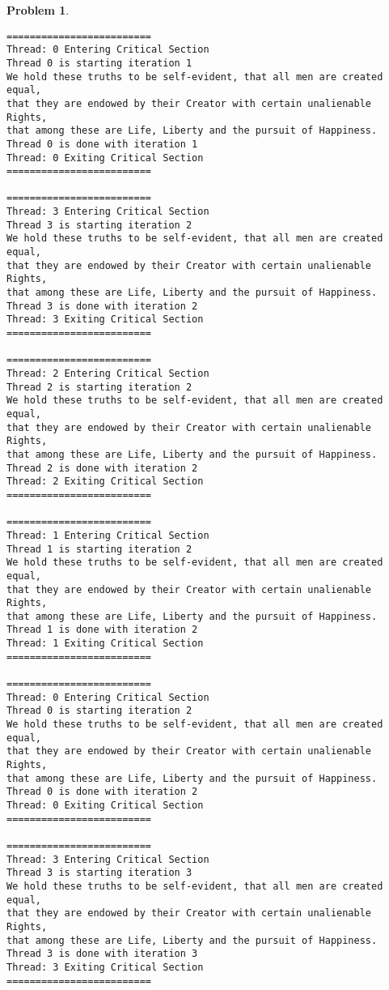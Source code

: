\documentclass{article}
\theoremstyle{problemstyle}
\newtheorem{problem}{Problem}
\begin{document}
\begin{problem}
\begin{enumerate}[label=(\alph*)]
\begin{lstlisting}
=========================
Thread: 0 Entering Critical Section
Thread 0 is starting iteration 1
We hold these truths to be self-evident, that all men are created equal,
that they are endowed by their Creator with certain unalienable Rights,
that among these are Life, Liberty and the pursuit of Happiness.
Thread 0 is done with iteration 1
Thread: 0 Exiting Critical Section
=========================

=========================
Thread: 3 Entering Critical Section
Thread 3 is starting iteration 2
We hold these truths to be self-evident, that all men are created equal,
that they are endowed by their Creator with certain unalienable Rights,
that among these are Life, Liberty and the pursuit of Happiness.
Thread 3 is done with iteration 2
Thread: 3 Exiting Critical Section
=========================

=========================
Thread: 2 Entering Critical Section
Thread 2 is starting iteration 2
We hold these truths to be self-evident, that all men are created equal,
that they are endowed by their Creator with certain unalienable Rights,
that among these are Life, Liberty and the pursuit of Happiness.
Thread 2 is done with iteration 2
Thread: 2 Exiting Critical Section
=========================

=========================
Thread: 1 Entering Critical Section
Thread 1 is starting iteration 2
We hold these truths to be self-evident, that all men are created equal,
that they are endowed by their Creator with certain unalienable Rights,
that among these are Life, Liberty and the pursuit of Happiness.
Thread 1 is done with iteration 2
Thread: 1 Exiting Critical Section
=========================

=========================
Thread: 0 Entering Critical Section
Thread 0 is starting iteration 2
We hold these truths to be self-evident, that all men are created equal,
that they are endowed by their Creator with certain unalienable Rights,
that among these are Life, Liberty and the pursuit of Happiness.
Thread 0 is done with iteration 2
Thread: 0 Exiting Critical Section
=========================

=========================
Thread: 3 Entering Critical Section
Thread 3 is starting iteration 3
We hold these truths to be self-evident, that all men are created equal,
that they are endowed by their Creator with certain unalienable Rights,
that among these are Life, Liberty and the pursuit of Happiness.
Thread 3 is done with iteration 3
Thread: 3 Exiting Critical Section
=========================


\end{lstlisting}
\end{enumerate}
\end{problem}
\end{document}
